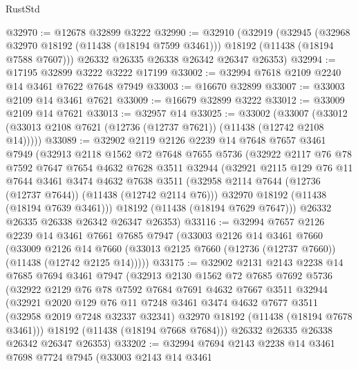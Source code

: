 \begin{lexlean}{RustStd}
\begin{coremodule}
@32970 := @12678 @32899 @3222
@32990 := @32910
    (@32919
      (@32945
        (@32968 @32970 @18192 (@11438 (@18194 @7599 @3461)))
        @18192
        (@11438 (@18194 @7588 @7607)))
      @26332
      @26335
      @26338
      @26342
      @26347
      @26353)
@32994 := @17195 @32899 @3222 @3222 @17199
@33002 := @32994 @7618 @2109 @2240 @14 @3461 @7622 @7648 @7949
@33003 := @16670 @32899
@33007 := @33003 @2109 @14 @3461 @7621
@33009 := @16679 @32899 @3222
@33012 := @33009 @2109 @14 @7621
@33013 := @32957 @14
@33025 := @33002
    (@33007 (@33012 (@33013 @2108 @7621 (@12736 (@12737 @7621)) (@11438 (@12742 @2108 @14)))))
@33089 := @32902
    @2119
    @2126
    @2239
    @14
    @7648
    @7657
    @3461
    @7949
    (@32913
      @2118
      @1562
      @72
      @7648
      @7655
      @5736
      (@32922
        @2117
        @76
        @78
        @7592
        @7647
        @7654
        @4632
        @7628
        @3511
        @32944
        (@32921
          @2115
          @129
          @76
          @11
          @7644
          @3461
          @3474
          @4632
          @7638
          @3511
          (@32958 @2114 @7644 (@12736 (@12737 @7644)) (@11438 (@12742 @2114 @76)))
          @32970
          @18192
          (@11438 (@18194 @7639 @3461)))
        @18192
        (@11438 (@18194 @7629 @7647)))
      @26332
      @26335
      @26338
      @26342
      @26347
      @26353)
@33116 := @32994
    @7657
    @2126
    @2239
    @14
    @3461
    @7661
    @7685
    @7947
    (@33003
      @2126
      @14
      @3461
      @7660
      (@33009
        @2126
        @14
        @7660
        (@33013 @2125 @7660 (@12736 (@12737 @7660)) (@11438 (@12742 @2125 @14)))))
@33175 := @32902
    @2131
    @2143
    @2238
    @14
    @7685
    @7694
    @3461
    @7947
    (@32913
      @2130
      @1562
      @72
      @7685
      @7692
      @5736
      (@32922
        @2129
        @76
        @78
        @7592
        @7684
        @7691
        @4632
        @7667
        @3511
        @32944
        (@32921
          @2020
          @129
          @76
          @11
          @7248
          @3461
          @3474
          @4632
          @7677
          @3511
          (@32958 @2019 @7248 @32337 @32341)
          @32970
          @18192
          (@11438 (@18194 @7678 @3461)))
        @18192
        (@11438 (@18194 @7668 @7684)))
      @26332
      @26335
      @26338
      @26342
      @26347
      @26353)
@33202 := @32994
    @7694
    @2143
    @2238
    @14
    @3461
    @7698
    @7724
    @7945
    (@33003
      @2143
      @14
      @3461

\end{coremodule}
\end{lexlean}
